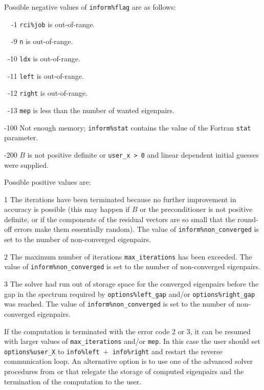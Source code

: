 \noindent
Possible negative values of {\tt inform\%flag}
are as follows:
%
\begin{description}
%
\item{~~-1}
\hskip 9pt
{\tt rci\%job}  is out-of-range.
%
\item{~~-9}
\hskip 7pt
{\tt n} is out-of-range.
%
\item{~-10}
\hskip 7pt
{\tt ldx} is out-of-range.
%
\item{~-11}
\hskip 7pt
{\tt left} is out-of-range.
%
\item{~-12}
\hskip 7pt
{\tt right} is out-of-range.
%
\item{~-13}
\hskip 7pt
{\tt mep} is less than 
the number of wanted eigenpairs.
%
\item{-100}
\hskip 4pt
Not enough memory;
{\tt inform\%stat} contains the value of the Fortran {\tt stat} parameter.
%
\item{-200}
\hskip 4pt
$B$ is not positive definite or {\tt user\_x > 0} and
linear dependent initial guesses were supplied.
%
\end{description}

\noindent
Possible positive values  are: 
%
\begin{description}
\item{1}
\hskip 9pt
The iterations have been terminated because no further improvement
in accuracy is possible (this may happen if $B$ or the preconditioner is
not positive definite, or if the components of the residual vectors
are so small that the round-off
errors make them essentially random).
The value of {\tt inform\%non\_converged} is set to the number
of non-converged eigenpairs.
\item{2}
\hskip 9pt
The maximum number of iterations {\tt max\_iterations} has been exceeded.
The value of {\tt inform\%non\_converged} is set to the number
of non-converged eigenpairs.
\item{3}
\hskip 9pt
The solver had run
out of storage space for the converged eigenpairs
before the gap in the spectrum 
required by {\tt options\%left\_gap} and/or {\tt options\%right\_gap}
was reached.
The value of {\tt inform\%non\_converged} is set to the number
of non-converged eigenpairs.
%
\end{description}

If the computation is terminated with the error code 2 or 3,
it can be resumed with larger values of {\tt max\_iterations} and/or {\tt mep}.
In this case the user should set {\tt options\%user\_X} to
{\tt info\%left $+$ info\%right}
and restart the reverse communication loop.
An alternative option is to use
one of the advanced solver procedures
from {\tt \advanced} or {\tt \engine}
that relegate the storage of computed eigenpairs and
the termination of the computation to the user.

